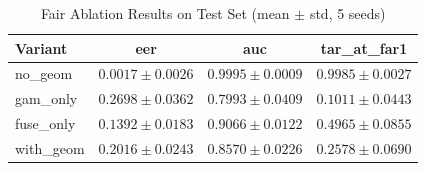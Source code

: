 \begin{table}[h]
\centering
\caption{Fair Ablation Results on Test Set (mean $\pm$ std, 5 seeds)}
\begin{tabular}{lccc}
\hline
Variant & eer & auc & tar_at_far1 \\
\hline
no\_geom & $0.0017 \pm 0.0026$ & $0.9995 \pm 0.0009$ & $0.9985 \pm 0.0027$ \\
gam\_only & $0.2698 \pm 0.0362$ & $0.7993 \pm 0.0409$ & $0.1011 \pm 0.0443$ \\
fuse\_only & $0.1392 \pm 0.0183$ & $0.9066 \pm 0.0122$ & $0.4965 \pm 0.0855$ \\
with\_geom & $0.2016 \pm 0.0243$ & $0.8570 \pm 0.0226$ & $0.2578 \pm 0.0690$ \\
\hline
\end{tabular}
\end{table}